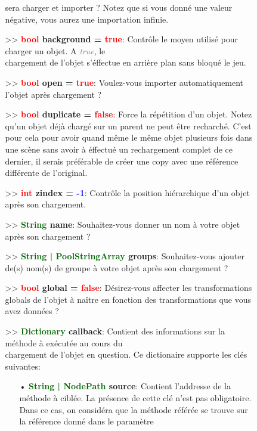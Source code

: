 \documentclass[a4paper, 11pt]{article}
\begin{document}
\begin{description}
\begin{itemize}
\begin{itemize}
				sera charger et importer ? Notez que si vous donné une valeur négative, vous aurez une 
				importation infinie.
				\item[>> \textbf{\textcolor{red}{bool} background = \textcolor{red}{true}}:] Contrôle le 
				moyen utilisé pour charger un objet. A \textit{\textcolor{gray}{true}}, le \\chargement de 
				l'objet s'éffectue en arrière plan sans bloqué le jeu.
				\item[>> \textbf{\textcolor{red}{bool} open = \textcolor{red}{true}}:] Voulez-vous importer 
				automatiquement l'objet après chargement ?
				\item[>> \textbf{\textcolor{red}{bool} duplicate = \textcolor{red}{false}}:] Force la 
				répétition d'un objet. Notez qu'un objet déjà chargé sur un parent ne peut être recharché.
				C'est pour cela pour avoir quand même le même objet plusieurs fois dans une scène sans avoir
				à éffectué un rechargement complet de ce dernier, il serais préférable de créer une copy
				avec une référence différente de l'original.
				\item[>> \textbf{\textcolor{red}{int} zindex = \textcolor{blue}{-1}}:] Contrôle la position
				hiérarchique d'un objet après son chargement.
				\item[>> \textbf{\textcolor{darkgreen}{String} name}:] Souhaitez-vous donner un nom à votre
				objet après son chargement ?
				\item[>> \textbf{\textcolor{darkgreen}{String | PoolStringArray} groups}:] Souhaitez-vous 
				ajouter de(s) nom(s) de groupe à votre objet après son chargement ?
				\item[>> \textbf{\textcolor{red}{bool} global = \textcolor{red}{false}}:] Désirez-vous 
				affecter les transformations globals de l'objet à naître en fonction des transformations que 
				vous avez données ?
				\item [>> \textbf{\textcolor{darkgreen}{Dictionary} callback}:] Contient des informations 
				sur la méthode à exécutée au cours du \\chargement de l'objet en question. Ce dictionaire
				supporte les clés suivantes:
			    \begin{itemize}
			       \item[• \textbf{\textcolor{darkgreen}{String | NodePath} source}:] Contient l'addresse de 
			       la méthode à ciblée. La présence de cette clé n'est pas obligatoire. Dans ce cas, on
			       considéra que la méthode référée se trouve sur la référence donné dans le paramètre

\end{itemize}
\end{itemize}
\end{itemize}
\end{description}
\end{document}
